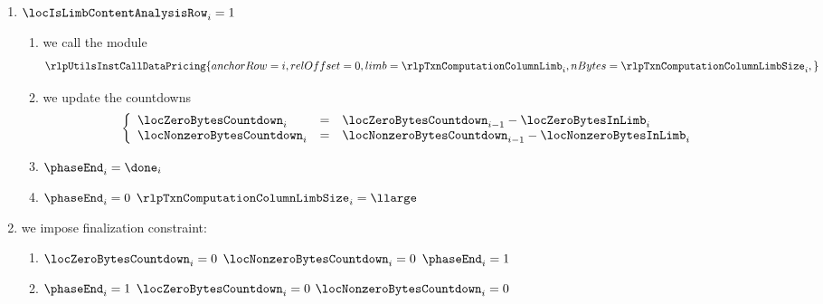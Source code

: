 \begin{enumerate}[resume]
	\item \If $\locIsLimbContentAnalysisRow _{i} = 1$ \Then
		\begin{enumerate}
			\item we call the \rlpUtilsMod{} module
				\[
					\rlpUtilsInstCallDataPricing {
						anchorRow = i              ,
						relOffset = 0              ,
						limb      = \rlpTxnComputationColumnLimb     _{i} ,
						nBytes    = \rlpTxnComputationColumnLimbSize _{i} ,
					}
				\]
			\item we update the countdowns
				\[
					\left\{ \begin{array}{lcl}
						\locZeroBytesCountdown    _{i} & = & \locZeroBytesCountdown    _{i - 1} - \locZeroBytesInLimb    _{i} \\
						\locNonzeroBytesCountdown _{i} & = & \locNonzeroBytesCountdown _{i - 1} - \locNonzeroBytesInLimb _{i} \\
					\end{array} \right.
				\]
			\item $\phaseEnd _{i} = \done _{i}$
			\item \If $\phaseEnd _{i} = 0$ \Then $\rlpTxnComputationColumnLimbSize _{i} = \llarge$
		\end{enumerate}
	\item we impose finalization constraint:
		\begin{enumerate}[resume]
			\item \If $\locZeroBytesCountdown _{i} = 0$ \et $\locNonzeroBytesCountdown _{i} = 0$ \Then $\phaseEnd _{i} = 1$
			\item \If $\phaseEnd _{i} = 1$ \Then $\locZeroBytesCountdown _{i} = 0$ \et   $\locNonzeroBytesCountdown _{i} = 0$
		\end{enumerate}
\end{enumerate}

